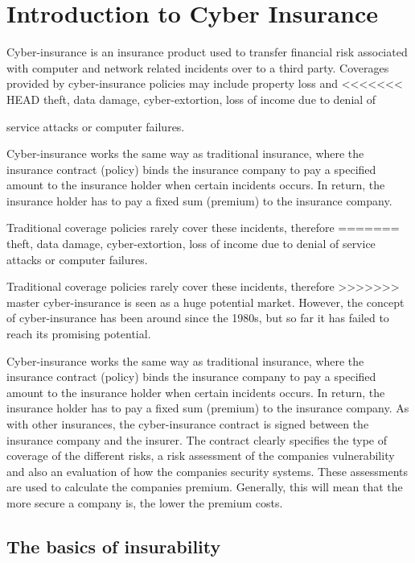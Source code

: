 \chapter{Introduction to Cyber Insurance}
\label{chp:introductionToCyberInsurance} 

Cyber-insurance is an insurance product used to transfer financial risk
associated with computer and network related incidents over to a third party.
 Coverages provided by cyber-insurance policies may include property loss and
<<<<<<< HEAD
  theft, data damage, cyber-extortion, loss of income due to denial of

   service attacks or computer failures. \cite{washingtonPaper}

  
    Cyber-insurance works the same way as traditional insurance, where the insurance contract (policy) binds the insurance company to pay a specified amount to the insurance holder when certain incidents occurs. In return, the insurance holder has to pay a fixed sum (premium) to the insurance company. \cite{enisarapport}

  Traditional coverage policies rarely cover these incidents, therefore 
=======
  theft, data damage, cyber-extortion, loss of income due to denial of service attacks or computer failures. \cite{washingtonpaper}

Traditional coverage policies rarely cover these incidents, therefore 
>>>>>>> master
   cyber-insurance is seen as a huge potential market. However, the concept 
   of cyber-insurance has been around since the 1980s, but so far it has failed to reach its promising potential. 
  
 
Cyber-insurance works the same way as traditional insurance, where the insurance contract (policy) binds the insurance company to pay a specified amount to the insurance holder when certain incidents occurs. In return, the insurance holder has to pay a fixed sum (premium) to the insurance company. \cite{robinson2012incentives}
    As with other insurances, the cyber-insurance contract is signed between the insurance company and the insurer. The contract clearly specifies the type of coverage of the different risks, a risk assessment of the companies vulnerability and also an evaluation of how the companies security systems. These assessments are used to calculate the companies premium. \cite{robinson2012incentives} Generally, this will mean that the more secure a company is, the lower the premium costs.  

\section{The basics of insurability}

